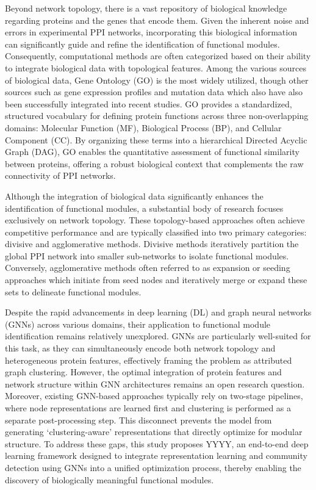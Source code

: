 Beyond network topology, there is a vast repository of biological knowledge regarding proteins and the genes that encode them. Given the inherent noise and errors in experimental PPI networks, incorporating this biological information can significantly guide and refine the identification of functional modules. Consequently, computational methods are often categorized based on their ability to integrate biological data with topological features. Among the various sources of biological data, Gene Ontology (GO) is the most widely utilized, though other sources such as gene expression profiles and mutation data which also have also been successfully integrated into recent studies. GO provides a standardized, structured vocabulary for defining protein functions across three non-overlapping domains: Molecular Function (MF), Biological Process (BP), and Cellular Component (CC). By organizing these terms into a hierarchical Directed Acyclic Graph (DAG), GO enables the quantitative assessment of functional similarity between proteins, offering a robust biological context that complements the raw connectivity of PPI networks.

Although the integration of biological data significantly enhances the identification of functional modules, a substantial body of research focuses exclusively on network topology. These topology-based approaches often achieve competitive performance and are typically classified into two primary categories: divisive and agglomerative methods. Divisive methods iteratively partition the global PPI network into smaller sub-networks to isolate functional modules. Conversely, agglomerative methods often referred to as expansion or seeding approaches which initiate from seed nodes and iteratively merge or expand these sets to delineate functional modules.

Despite the rapid advancements in deep learning (DL) and graph neural networks (GNNs) across various domains, their application to functional module identification remains relatively unexplored. GNNs are particularly well-suited for this task, as they can simultaneously encode both network topology and heterogeneous protein features, effectively framing the problem as attributed graph clustering. However, the optimal integration of protein features and network structure within GNN architectures remains an open research question. Moreover, existing GNN-based approaches typically rely on two-stage pipelines, where node representations are learned first and clustering is performed as a separate post-processing step. This disconnect prevents the model from generating ‘clustering-aware’ representations that directly optimize for modular structure. To address these gaps, this study proposes YYYY, an end-to-end deep learning framework designed to integrate representation learning and community detection using GNNs into a unified optimization process, thereby enabling the discovery of biologically meaningful functional modules.

